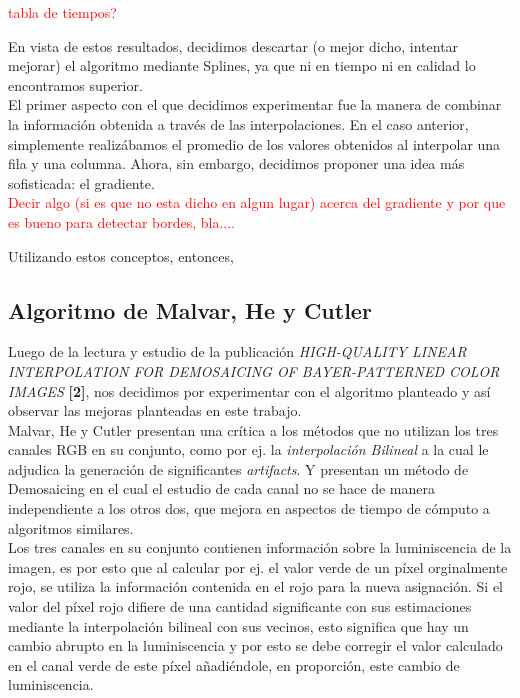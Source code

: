\documentclass[a4paper]{article}
\begin{document}
\textcolor{red}{tabla de tiempos?\\}

En vista de estos resultados, decidimos descartar (o mejor dicho, intentar mejorar) el algoritmo mediante Splines, ya que ni en tiempo ni en calidad lo encontramos superior.\\

El primer aspecto con el que decidimos experimentar fue la manera de combinar la información obtenida a través de las interpolaciones. En el caso anterior, simplemente realizábamos el promedio de los valores obtenidos al interpolar una fila y una columna. Ahora, sin embargo, decidimos proponer una idea más sofisticada: el gradiente. \\

\textcolor{red}{Decir algo (si es que no esta dicho en algun lugar) acerca del gradiente y por que es bueno para detectar bordes, bla....\\}

Utilizando estos conceptos, entonces, 


\newpage
\subsection{Algoritmo de Malvar, He y Cutler}

Luego de la lectura y estudio de la publicaci\'on \textit{HIGH-QUALITY LINEAR INTERPOLATION
FOR DEMOSAICING OF BAYER-PATTERNED COLOR IMAGES} \textbf{[2]}, nos decidimos por experimentar con el algoritmo planteado y as\'i observar las mejoras planteadas en este trabajo.\\

Malvar, He y Cutler presentan una cr\'itica a los m\'etodos que no utilizan los tres canales RGB en su conjunto, como por ej. la \emph{interpolaci\'on Bilineal} a la cual le adjudica la generaci\'on de significantes \textit{artifacts}. Y presentan un m\'etodo de Demosaicing en el cual el estudio de cada canal no se hace de manera independiente a los otros dos, que mejora en aspectos de tiempo de c\'omputo a algoritmos similares.\\

Los tres canales en su conjunto contienen informaci\'on sobre la luminiscencia de la imagen, es por esto que al calcular por ej. el valor verde de un p\'ixel orginalmente rojo, se utiliza la informaci\'on contenida en el rojo para la nueva asignaci\'on. Si el valor del p\'ixel rojo difiere de una cantidad significante con sus estimaciones mediante la interpolaci\'on bilineal con sus vecinos, esto significa que hay un cambio abrupto en la luminiscencia y por esto se debe corregir el valor calculado en el canal verde de este p\'ixel a\~nadi\'endole, en proporci\'on, este cambio de luminiscencia.\\
\end{document}
